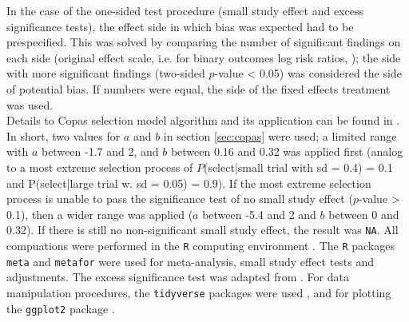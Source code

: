 \documentclass[11pt,a4paper,twoside]{book}\usepackage[]{graphicx}\usepackage[]{color}
\begin{document}
In the case of the one-sided test procedure (small study effect and excess significance tests), the effect side in which bias was expected had to be prespecified. This was solved by comparing the number of significant findings on each side (original effect scale, i.e. for binary outcomes log risk ratios, \etc); the side with more significant findings (two-sided $p$-value < 0.05) was considered the side of potential bias. If numbers were equal, the side of the fixed effects treatment was used. \\
Details to Copas selection model algorithm and its application can be found in \citet{limitmeta}. In short, two values for $a$ and $b$ in section \ref{sec:copas} were used; a limited range with $a$ between -1.7 and 2, and $b$ between 0.16 and 0.32 was applied first (analog to a most extreme selection process of $P$(select|small trial with sd = 0.4) = 0.1 and P(select|large trial w. sd  = 0.05) = 0.9). If the most extreme selection process is unable to pass the significance test of no small study effect ($p$-value > 0.1), then a wider range was applied ($a$  between -5.4 and 2 and $b$ between 0 and 0.32). If there is still no non-significant small study effect, the result was \texttt{NA}.
All compuations were performed in the \texttt{R} computing environment \citep{R.base}. The \texttt{R} packages \texttt{meta} \citep{meta.package} and \texttt{metafor} \citep{metafor.package} were used for meta-analysis, small study effect tests and adjustments. The excess significance test was adapted from \citet{vanAert.2019}. For data manipulation procedures, the \texttt{tidyverse} packages were used \citep{tidyverse.package}, and for plotting the \texttt{ggplot2} package \citep{ggplot2}.\\










\end{document}
